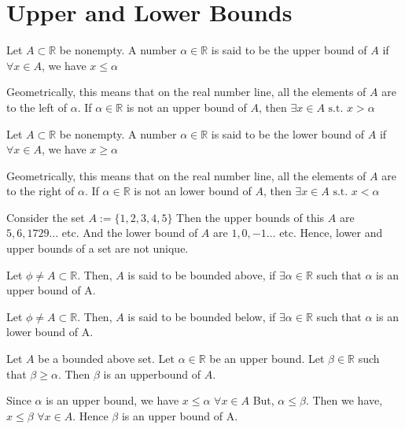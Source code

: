 \documentclass{scrartcl}
\newcommand{\rn}{\mathbb{R}}
\begin{document}
    \section{Upper and Lower Bounds}
    \begin{definition}
        Let $A \subset \rn$ be nonempty. A number $\alpha \in \rn$ is said to be the upper bound of $A$ if $\forall x \in A$, we have $x \leq \alpha$
    \end{definition}
    Geometrically, this means that on the real number line, all the elements of $A$ are to the left of $\alpha$. If $\alpha \in \rn$ is not an upper bound of $A$, then $\exists x \in A \text{ s.t. } x > \alpha$
    \begin{definition}
        Let $A \subset \rn$ be nonempty. A number $\alpha \in \rn$ is said to be the lower bound of $A$ if $\forall x \in A$, we have $x \geq \alpha$
    \end{definition}
    Geometrically, this means that on the real number line, all the elements of $A$ are to the right of $\alpha$. If $\alpha \in \rn$ is not an lower bound of $A$, then $\exists x \in A \text{ s.t. } x < \alpha$
    \begin{example}
        Consider the set $A := \{1, 2, 3, 4, 5\}$ Then the upper bounds of this $A$ are $5, 6, 1729 \dots$ etc.
        And the lower bound of $A$ are $1, 0, -1 \dots$ etc. Hence, lower and upper bounds of a set are not unique.
    \end{example}
    \begin{definition}
        Let $\phi \neq A \subset \rn$. Then, $A$ is said to be bounded above, if $\exists \alpha \in \rn$ such that $\alpha$ is an upper bound of A.
    \end{definition}
    \begin{definition}
        Let $\phi \neq A \subset \rn$. Then, $A$ is said to be bounded below, if $\exists \alpha \in \rn$ such that $\alpha$ is an lower bound of A.
    \end{definition}
    \begin{theorem}
        Let $A$ be a bounded above set. Let $\alpha \in \rn$ be an upper bound. Let $\beta \in \rn$ such that 
        $\beta \geq \alpha$. Then $\beta$ is an upperbound of $A$.
    \end{theorem}
        \begin{proof*}
            Since $\alpha$ is an upper bound, we have $x \leq \alpha \,\, \forall x \in A$
            But, $\alpha \leq \beta$. Then we have, $x \leq \beta \,\, \forall x \in A$.
            Hence $\beta$ is an upper bound of A.
        \end{proof*}
\end{document}
